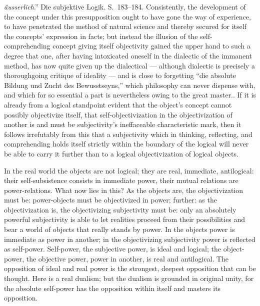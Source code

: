 \documentclass[12pt]{article}
\begin{document}
{\emph{äusserlich}.'' Die subjektive Logik. S.\ 183--184. Consistently, the
development of the concept under this presupposition ought to have gone the
way of experience, to have penetrated the method of natural science and
thereby secured for itself the concepts' expression in facts; but instead
the illusion of the self-comprehending concept giving itself objectivity
gained the upper hand to such a degree that one, after having intoxicated
oneself in the dialectic of the immanent method, has now quite given up the
dialectical --- although dialectic is precisely a thoroughgoing critique of
ideality --- and is close to forgetting ``die absolute Bildung und Zucht des
Bewusstseyns,'' which philosophy can never dispense with, and which for so
essential a part is nevertheless owing to the great master.}. If it is
already from a logical standpoint evident that the object's concept cannot
possibly objectivize itself, that self-objectivization in the objectivization
of another is and must be subjectivity's ineffaceable characteristic mark,
then it follows irrefutably from this that a subjectivity which in thinking,
reflecting, and comprehending holds itself strictly within the boundary of
the logical will never be able to carry it further than to a logical
objectivization of logical objects.

In the real world the objects are not logical; they are real, immediate,
antilogical: their self-subsistence consists in immediate power, their
mutual relations are power-relations. What now lies in this? As the objects
are, the objectivization must be: power-objects must be objectivized in
power; further: as the objectivization is, the objectivizing subjectivity
must be: only an absolutely powerful subjectivity is able to let realities
proceed from their possibilities and bear a world of objects that really
stands by power. In the objects power is immediate as power in another; in
the objectivizing subjectivity power is reflected as self-power. Self-power,
the subjective power, is ideal and logical; the object-power, the objective
power, power in another, is real and antilogical. The opposition of ideal
and real power is the strongest, deepest opposition that can be thought.
Here is a real dualism; but the dualism is grounded in original unity, for
the absolute self-power has the opposition within itself and masters its
opposition.
\end{document}
